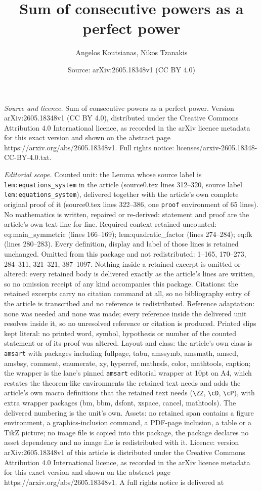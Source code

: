 \documentclass[10pt,a4paper]{amsart}
\title[Sum of consecutive powers as a perfect power]{Sum of consecutive powers as a perfect power}
\author{Angelos Koutsianas, Nikos Tzanakis}
\date{Source: arXiv:2605.18348v1 (CC BY 4.0)}
\begin{document}
\maketitle

\noindent\emph{Source and licence.} Sum of consecutive powers as a perfect power. Version arXiv:2605.18348v1 (CC BY 4.0), distributed under the Creative Commons Attribution 4.0 International licence, as recorded in the arXiv licence metadata for this exact version and shown on the abstract page https://arxiv.org/abs/2605.18348v1. Full rights notice: licenses/arxiv-2605.18348-CC-BY-4.0.txt.\par\smallskip

\noindent\textit{Editorial scope.} Counted unit: the Lemma whose source label is \texttt{lem:equations\_system} in the article (source0.tex lines 312--320, source label \texttt{lem:equations\_system}), delivered together with the article's own complete original proof of it (source0.tex lines 322--386, one \texttt{proof} environment of 65 lines). No mathematics is written, repaired or re-derived: statement and proof are the article's own text line for line. Required context retained uncounted: eq:main\_symmetric (lines 166--169); lem:quadratic\_factor (lines 274--284); eq:fk (lines 280--283). Every definition, display and label of those lines is retained unchanged. Omitted from this package and not redistributed: 1--165, 170--273, 284--311, 321--321, 387--1097. Nothing inside a retained excerpt is omitted or altered: every retained body is delivered exactly as the article's lines are written, so no omission receipt of any kind accompanies this package. Citations: the retained excerpts carry no citation command at all, so no bibliography entry of the article is transcribed and no reference is redistributed. Reference adaptation: none was needed and none was made; every reference inside the delivered unit resolves inside it, so no unresolved reference or citation is produced. Printed slips kept literal: no printed word, symbol, hypothesis or number of the counted statement or of its proof was altered. Layout and class: the article's own class is \texttt{amsart} with packages including fullpage, tabu, amssymb, amsmath, amscd, amsbsy, comment, enumerate, xy, hyperref, mathrsfs, color, mathtools, caption; the wrapper is the lane's pinned \texttt{amsart} editorial wrapper at 10pt on A4, which restates the theorem-like environments the retained text needs and adds the article's own macro definitions that the retained text needs (\texttt{\textbackslash ZZ}, \texttt{\textbackslash cD}, \texttt{\textbackslash cP}), with extra wrapper packages (bm, bbm, dsfont, xspace, cancel, mathtools). The delivered numbering is the unit's own. Assets: no retained span contains a figure environment, a graphics-inclusion command, a PDF-page inclusion, a table or a TikZ picture; no image file is copied into this package, the package declares no asset dependency and no image file is redistributed with it. Licence: version arXiv:2605.18348v1 of this article is distributed under the Creative Commons Attribution 4.0 International licence, as recorded in the arXiv licence metadata for this exact version and shown on the abstract page https://arxiv.org/abs/2605.18348v1. A full rights notice is delivered at 
\end{document}
